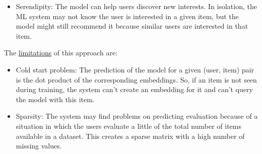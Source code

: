 \documentclass{article}
\begin{document}
\begin{itemize}
\begin{itemize}
            \item Serendipity: The model can help users discover new interests. In isolation, the ML system may not know the user is interested in a given item, but the model might still recommend it because similar users are interested in that item. 
      \end{itemize}
      The \underline{limitations} of this approach are:
      \begin{itemize}
            \item Cold start problem: The prediction of the model for a given (user, item) pair is the dot product of the corresponding embeddings. So, if an item is not seen during training, the system can't create an embedding for it and can't query the model with this item.
            \item Sparsity: The system may find problems on predicting evaluation because of a situation in which the users evaluate a little of the total number of items available in a dataset. This creates a sparse matrix with a high number of missing values.
      \end{itemize}


\end{itemize}
\end{document}
